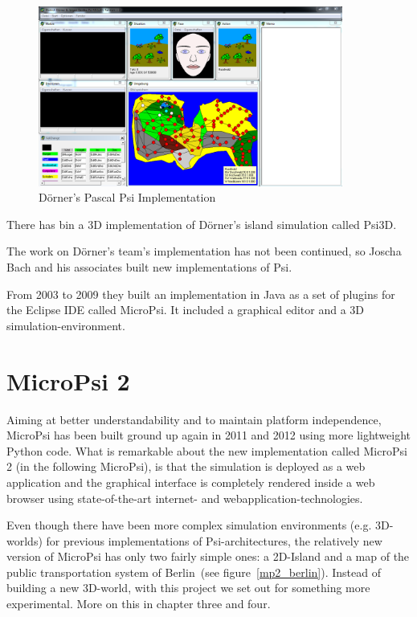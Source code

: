 \begin{figure}[h]
  \centering
    \includegraphics[width=10cm]{graphics/psi_screen1}
  \caption{Dörner's Pascal Psi Implementation}
  \label{psi_screen}
\end{figure}

There has bin a 3D implementation of Dörner's island simulation called Psi3D.

The work on Dörner's team's implementation has not been continued, so Joscha Bach and his associates built new implementations of Psi.

From 2003 to 2009 they built an implementation in Java as a set of plugins for the Eclipse IDE called MicroPsi. It included a graphical editor and a 3D simulation-environment. 

    \section{MicroPsi 2}
Aiming at better understandability and to maintain platform independence, MicroPsi has been built ground up again in 2011 and 2012 using more lightweight Python code. What is remarkable about the new implementation called MicroPsi 2 (in the following MicroPsi), is that the simulation is deployed as a web application and the graphical interface is completely rendered inside a web browser using state-of-the-art internet- and webapplication-technologies.~\cite{conf/agi/Bach12}
        
Even though there have been more complex simulation environments (e.g. 3D-worlds) for previous implementations of Psi-architectures, the relatively new version of MicroPsi has only two fairly simple ones: a 2D-Island and a map of the public transportation system of Berlin~(see figure~\ref{mp2_berlin}). Instead of building a new 3D-world, with this project we set out for something more experimental. More on this in chapter three and four.

